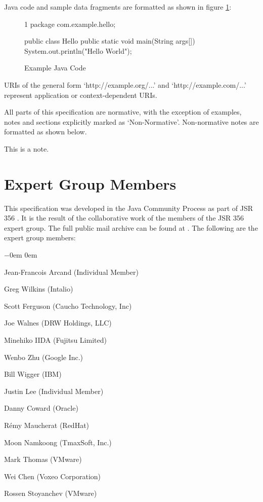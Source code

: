 Java code and sample data fragments are formatted as shown in figure \ref{ex1}:

\begin{figure}[hbtp]
\caption{Example Java Code}
\label{ex1}
\begin{listing}{1}
package com.example.hello;

public class Hello {
    public static void main(String args[]) {
        System.out.println("Hello World");
    }
}\end{listing}
\end{figure}

URIs of the general form `http://example.org/...' and `http://example.com/...' represent application or context-dependent URIs.

All parts of this specification are normative, with the exception of examples, notes and sections explicitly marked as `Non-Normative'. Non-normative notes are formatted as shown below.

\begin{nnnote*}
This is a note.
\end{nnnote*}

\section{Expert Group Members} 
\label{expert_group}

This specification was developed in the Java Community Process as part of JSR 356 \cite{jsr356}. It is the result of the collaborative work of the members of the JSR 356 expert group. The full public mail archive can be found at \cite{mailinglist}. The following are the expert group members:

\begin{list}{$-$}{\parsep 0em  0em}
\item Jean-Francois Arcand (Individual Member)
\item Greg Wilkins (Intalio)
\item Scott Ferguson (Caucho Technology, Inc)
\item Joe Walnes (DRW Holdings, LLC)
\item Minehiko IIDA (Fujitsu Limited) 
\item Wenbo Zhu (Google Inc.)
\item Bill Wigger (IBM)
\item Justin Lee (Individual Member)
\item Danny Coward (Oracle)
\item Rémy Maucherat (RedHat)
\item Moon Namkoong (TmaxSoft, Inc.)
\item Mark Thomas (VMware)
\item Wei Chen (Voxeo Corporation)
\item Rossen Stoyanchev (VMware)
\end{list}

